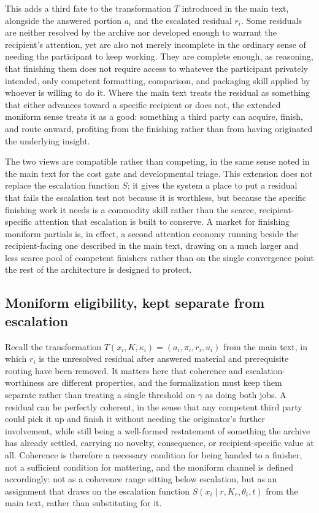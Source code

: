 \documentclass[11pt]{article}
\begin{document}
This adds a third fate to the transformation $T$ introduced in the main text, alongside the answered portion $a_i$ and the escalated residual $r_i$. Some residuals are neither resolved by the archive nor developed enough to warrant the recipient's attention, yet are also not merely incomplete in the ordinary sense of needing the participant to keep working. They are complete enough, as reasoning, that finishing them does not require access to whatever the participant privately intended, only competent formatting, comparison, and packaging skill applied by whoever is willing to do it. Where the main text treats the residual as something that either advances toward a specific recipient or does not, the extended moniform sense treats it as a good: something a third party can acquire, finish, and route onward, profiting from the finishing rather than from having originated the underlying insight.

The two views are compatible rather than competing, in the same sense noted in the main text for the cost gate and developmental triage. This extension does not replace the escalation function $S$; it gives the system a place to put a residual that fails the escalation test not because it is worthless, but because the specific finishing work it needs is a commodity skill rather than the scarce, recipient-specific attention that escalation is built to conserve. A market for finishing moniform partials is, in effect, a second attention economy running beside the recipient-facing one described in the main text, drawing on a much larger and less scarce pool of competent finishers rather than on the single convergence point the rest of the architecture is designed to protect.

\subsection{Moniform eligibility, kept separate from escalation}

Recall the transformation $T(x_i, K, \kappa_i) = (a_i, \pi_i, r_i, u_i)$ from the main text, in which $r_i$ is the unresolved residual after answered material and prerequisite routing have been removed. It matters here that coherence and escalation-worthiness are different properties, and the formalization must keep them separate rather than treating a single threshold on $\gamma$ as doing both jobs. A residual can be perfectly coherent, in the sense that any competent third party could pick it up and finish it without needing the originator's further involvement, while still being a well-formed restatement of something the archive has already settled, carrying no novelty, consequence, or recipient-specific value at all. Coherence is therefore a necessary condition for being handed to a finisher, not a sufficient condition for mattering, and the moniform channel is defined accordingly: not as a coherence range sitting below escalation, but as an assignment that draws on the escalation function $S(x_i \mid r, K_r, \theta_i, t)$ from the main text, rather than substituting for it.
\end{document}
